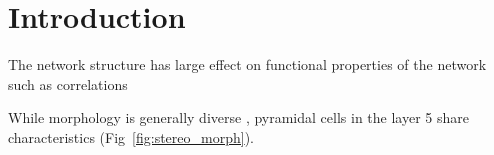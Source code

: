 
\section*{Introduction}

The network structure has large effect on functional properties of the network such as correlations \cite{Pernice2011}





While morphology is generally diverse , pyramidal cells in the layer 5 share characteristics (Fig~\ref{fig:stereo_morph}). 



